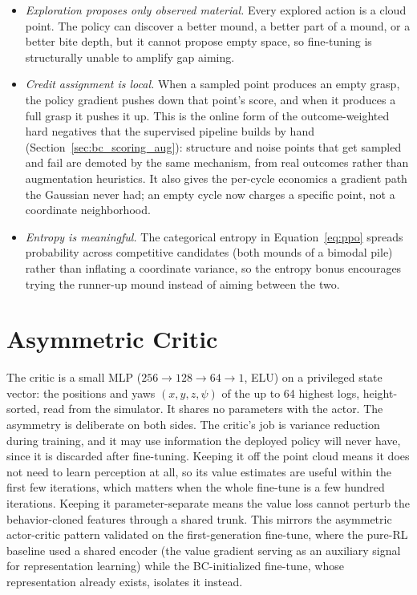 \begin{itemize}
\item \emph{Exploration proposes only observed material.} Every explored
action is a cloud point. The policy can discover a better mound, a better
part of a mound, or a better bite depth, but it cannot propose empty space,
so fine-tuning is structurally unable to amplify gap aiming.
\item \emph{Credit assignment is local.} When a sampled point produces an
empty grasp, the policy gradient pushes down that point's score, and when it
produces a full grasp it pushes it up. This is the online form of the
outcome-weighted hard negatives that the supervised pipeline builds by hand
(Section~\ref{sec:bc_scoring_aug}): structure and noise points that get
sampled and fail are demoted by the same mechanism, from real outcomes
rather than augmentation heuristics. It also gives the per-cycle economics a
gradient path the Gaussian never had; an empty cycle now charges a specific
point, not a coordinate neighborhood.
\item \emph{Entropy is meaningful.} The categorical entropy in
Equation~\eqref{eq:ppo} spreads probability across competitive candidates
(both mounds of a bimodal pile) rather than inflating a coordinate variance,
so the entropy bonus encourages trying the runner-up mound instead of
aiming between the two.
\end{itemize}

\section{Asymmetric Critic}
\label{sec:rl_critic}

The critic is a small MLP ($256 \to 128 \to 64 \to 1$, ELU) on a privileged
state vector: the positions and yaws $(x, y, z, \psi)$ of the up to 64
highest logs, height-sorted, read from the simulator. It shares no
parameters with the actor. The asymmetry is deliberate on both sides. The
critic's job is variance reduction during training, and it may use
information the deployed policy will never have, since it is discarded after
fine-tuning. Keeping it off the point cloud means it does not need to learn
perception at all, so its value estimates are useful within the first few
iterations, which matters when the whole fine-tune is a few hundred
iterations. Keeping it parameter-separate means the value loss cannot
perturb the behavior-cloned features through a shared trunk. This mirrors
the asymmetric actor-critic pattern validated on the first-generation
fine-tune, where the pure-RL baseline used a shared encoder (the value
gradient serving as an auxiliary signal for representation learning) while
the BC-initialized fine-tune, whose representation already exists, isolates
it instead.

